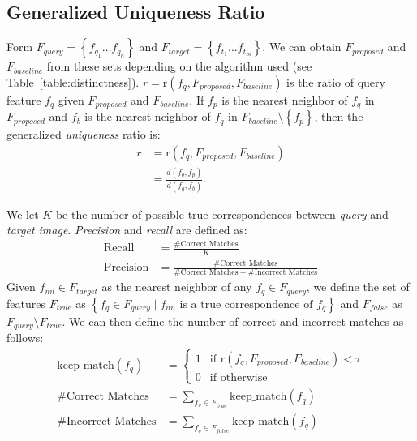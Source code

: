 \documentclass[10pt,journal,cspaper,compsoc]{IEEEtran}
\newcommand{\twopartdef}[4]
{
	\left\{
		\begin{array}{ll}
			#1 & \mbox{if } #2 \\
			#3 & \mbox{if } #4
		\end{array}
	\right.
}
\begin{document}
\subsection{Generalized Uniqueness Ratio}


Form $F_{query} = \left\{f_{q_1} \ldots f_{q_n}\right\}$ and $F_{target} 
= \left\{f_{t_1} \ldots f_{t_m}\right\}$.  We can obtain $F_{proposed}$ 
and $F_{baseline}$ from these sets depending on the algorithm used (see 
Table~\ref{table:distinctness}). $r = \text{r}(f_{q}, F_{proposed}, 
F_{baseline})$ is the ratio of query feature $f_{q}$ given 
$F_{proposed}$ and $F_{baseline}$.  If $f_{p}$ is the nearest neighbor 
of $f_{q}$ in $F_{proposed}$ and $f_{b}$ is the nearest neighbor of 
$f_{q}$ in $F_{baseline} \setminus \left\{f_{p}\right\}$, then the 
generalized \emph{uniqueness} ratio is:
\begin{align*}
    r &= \text{r}(f_{q}, F_{proposed}, F_{baseline}) \\
        &= \frac{d(f_{q}, f_{p})}{d(f_{q}, f_{b})}.
\end{align*}

We let $K$ be the number of possible true correspondences between \emph{query} 
and \emph{target image}. \emph{Precision} and \emph{recall} are 
defined as:
\begin{align*}
    \textrm{Recall} &= \frac{\#\textrm{Correct Matches}}{K} \\
    \textrm{Precision} &= \frac{\#\textrm{Correct 
    Matches}}{\#\textrm{Correct Matches} + \#\textrm{Incorrect Matches}}
\end{align*}
Given $f_{nn} \in F_{target}$ as the nearest neighbor of any 
$f_q \in F_{query}$, we define the set of features $F_{true}$ as 
$\left\{ f_{q} \in F_{query} \mid f_{nn} \text{ is a true correspondence 
of } f_{q} \right\}$ and $F_{false}$ as $F_{query} \setminus F_{true}$.  
We can then define the number of correct and incorrect matches as 
follows:
\begin{align*}
    \textrm{keep\_match}(f_{q}) &= \twopartdef{ 1 }{\text{r}(f_{q}, 
    F_{proposed}, F_{baseline}) <
    \tau}{0}{\textrm{otherwise}} \\
    \#\textrm{Correct Matches} &= \sum_{f_{q} \in F_{true}} 
    \textrm{keep\_match}(f_{q})\\
    \#\textrm{Incorrect Matches} &= \sum_{f_{q} \in F_{false}}
    \textrm{keep\_match}(f_{q})
\end{align*}
\end{document}
